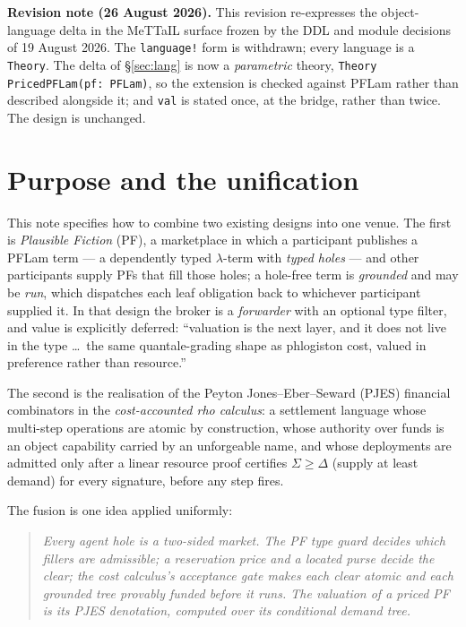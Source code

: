 \documentclass[11pt]{article}
\theoremstyle{definition}
\newcommand{\PF}{\textsf{PF}}
\newcommand{\PFLam}{\textsf{PFLam}}
\begin{document}
\begin{center}
\begin{minipage}{0.95\linewidth}\small
\textbf{Revision note (26 August 2026).} This revision re-expresses the object-language delta in the
MeTTaIL surface frozen by the DDL and module decisions of 19 August 2026. The
\texttt{language!} form is withdrawn; every language is a \texttt{Theory}. The delta of
\S\ref{sec:lang} is now a \emph{parametric} theory, \texttt{Theory PricedPFLam(pf: PFLam)}, so the
extension is checked against \PFLam{} rather than described alongside it; and \texttt{val} is stated
once, at the bridge, rather than twice. The design is unchanged.
\end{minipage}
\end{center}
\vspace{0.6em}

\tableofcontents

\section{Purpose and the unification}\label{sec:purpose}

This note specifies how to combine two existing designs into one venue. The first is
\emph{Plausible Fiction} (\PF), a marketplace in which a participant publishes a \PFLam{} term ---
a dependently typed $\lambda$-term with \emph{typed holes} --- and other participants supply \PF{}s
that fill those holes; a hole-free term is \emph{grounded} and may be \emph{run}, which dispatches
each leaf obligation back to whichever participant supplied it. In that design the broker is a
\emph{forwarder} with an optional type filter, and value is explicitly deferred: ``valuation is the
next layer, and it does not live in the type \ldots\ the same quantale-grading shape as phlogiston
cost, valued in preference rather than resource.''

The second is the realisation of the Peyton Jones--Eber--Seward (PJES) financial combinators in the
\emph{cost-accounted rho calculus}: a settlement language whose multi-step operations are atomic by
construction, whose authority over funds is an object capability carried by an unforgeable name, and
whose deployments are admitted only after a linear resource proof certifies $\Sigma \ge \Delta$
(supply at least demand) for every signature, before any step fires.

The fusion is one idea applied uniformly:

\begin{quote}\itshape
Every agent hole is a two-sided market. The \PF{} type guard decides which fillers are
\emph{admissible}; a reservation price and a located purse decide the \emph{clear}; the cost
calculus's acceptance gate makes each clear atomic and each grounded tree provably funded before it
runs. The valuation of a priced \PF{} is its PJES denotation, computed over its conditional demand
tree.
\end{quote}
\end{document}
